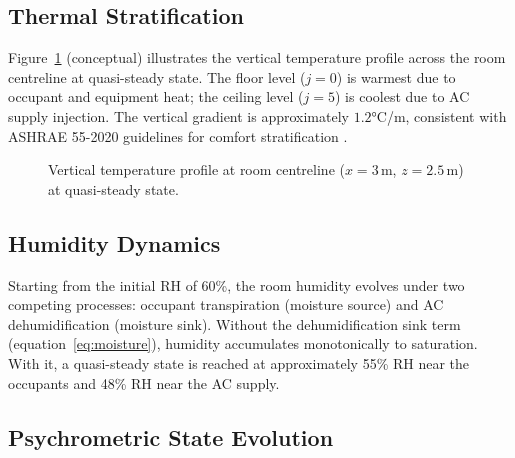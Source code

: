 \documentclass[12pt,a4paper]{report}
\begin{document}
\subsection{Thermal Stratification}
\label{subsec:stratification}

Figure~\ref{fig:stratification} (conceptual) illustrates the vertical temperature profile across the room centreline at quasi-steady state. The floor level ($j=0$) is warmest due to occupant and equipment heat; the ceiling level ($j=5$) is coolest due to AC supply injection. The vertical gradient is approximately $1.2$°C/m, consistent with ASHRAE 55-2020 guidelines for comfort stratification \cite{ashrae55}.

\begin{figure}[H]
\centering
{}
\caption{Vertical temperature profile at room centreline ($x=3$\,m, $z=2.5$\,m) at quasi-steady state.}
\label{fig:stratification}
\end{figure}

\subsection{Humidity Dynamics}
\label{subsec:humidity}

Starting from the initial RH of 60\%, the room humidity evolves under two competing processes: occupant transpiration (moisture source) and AC dehumidification (moisture sink). Without the dehumidification sink term (equation~\ref{eq:moisture}), humidity accumulates monotonically to saturation. With it, a quasi-steady state is reached at approximately 55\% RH near the occupants and 48\% RH near the AC supply.

\subsection{Psychrometric State Evolution}
\label{subsec:psychro_state}
\end{document}
